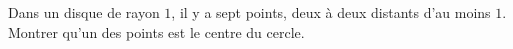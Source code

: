 Dans un disque de rayon $1$, il y a sept points, deux à deux distants d'au moins $1$. Montrer qu'un des points est le centre du cercle.
